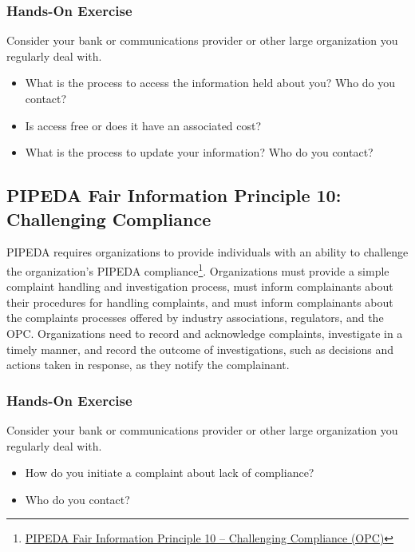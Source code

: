 \begin{tcolorbox}[colback=code]
\subsubsection*{Hands-On Exercise}

Consider your bank or communications provider or other large organization you regularly deal with. 
\begin{itemize}
  \item What is the process to access the information held about you? Who do you contact?
  \item Is access free or does it have an associated cost?
  \item What is the process to update your information? Who do you contact?
\end{itemize}
\end{tcolorbox}

\subsection*{PIPEDA Fair Information Principle 10: Challenging Compliance}

PIPEDA requires organizations to provide individuals with an ability to challenge the organization's PIPEDA compliance\footnote{\href{https://www.priv.gc.ca/en/privacy-topics/privacy-laws-in-canada/the-personal-information-protection-and-electronic-documents-act-pipeda/p_principle/principles/p_compliance/}{PIPEDA Fair Information Principle 10 -- Challenging Compliance (OPC)}}. Organizations must provide a simple complaint handling and investigation process, must inform complainants about their procedures for handling complaints, and must inform complainants about the complaints processes offered by industry associations, regulators, and the OPC. Organizations need to record and acknowledge complaints, investigate in a timely manner, and record the outcome of investigations, such as decisions and actions taken in response, as they notify the complainant. 

\begin{tcolorbox}[colback=code]
\subsubsection*{Hands-On Exercise}

Consider your bank or communications provider or other large organization you regularly deal with. 
\begin{itemize}
  \item How do you initiate a complaint about lack of compliance?
  \item Who do you contact?
\end{itemize}
\end{tcolorbox}

